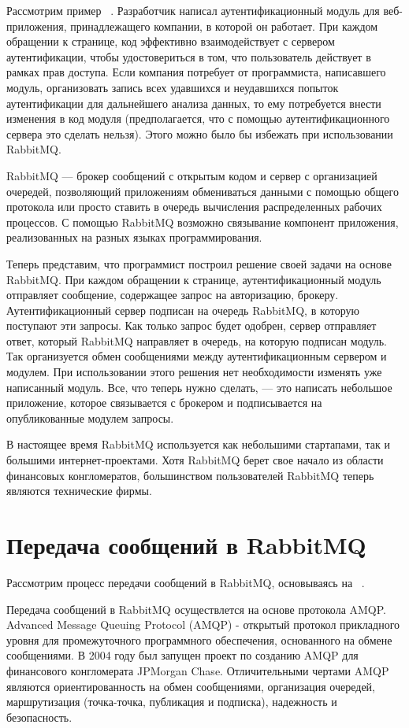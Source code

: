 Рассмотрим пример ~\cite{rabbitmq_in_action}. Разработчик написал аутентификационный модуль для веб-приложения, принадлежащего компании, в которой он работает. При каждом обращении к странице, код эффективно взаимодействует с сервером аутентификации, чтобы удостовериться в том, что пользователь действует в рамках прав доступа. Если компания потребует от программиста, написавшего модуль, организовать запись всех удавшихся и неудавшихся попыток аутентификации для дальнейшего анализа данных, то ему потребуется внести изменения в код модуля (предполагается, что с помощью аутентификационного сервера это сделать нельзя). Этого можно было бы избежать при использовании RabbitMQ.

RabbitMQ --- брокер сообщений с открытым кодом и сервер с организацией очередей, позволяющий приложениям обмениваться данными с помощью общего протокола или просто ставить в очередь вычисления распределенных рабочих процессов. С помощью RabbitMQ возможно связывание компонент приложения, реализованных на разных языках программирования.

Теперь представим, что программист построил решение своей задачи на основе RabbitMQ. При каждом обращении к странице, аутентификационный модуль отправляет сообщение, содержащее запрос на авторизацию, брокеру. Аутентификационный сервер подписан на очередь RabbitMQ, в которую поступают эти запросы. Как только запрос будет одобрен, сервер отправляет ответ, который RabbitMQ направляет в очередь, на которую подписан модуль. Так организуется обмен сообщениями между аутентификационным сервером и модулем. При использовании этого решения нет необходимости изменять уже написанный модуль.  Все, что теперь нужно сделать, --- это написать небольшое приложение, которое связывается с брокером и подписывается на опубликованные модулем запросы.

В настоящее время RabbitMQ используется как небольшими стартапами, так и большими интернет-проектами. Хотя RabbitMQ берет свое начало из области финансовых конгломератов, большинством пользователей RabbitMQ теперь являются технические фирмы.

\section{Передача сообщений в RabbitMQ} 
Рассмотрим процесс передачи сообщений в RabbitMQ, основываясь на ~\cite{rabbitmq_in_action}.

Передача сообщений в RabbitMQ осуществлется на основе протокола AMQP. Advanced Message Queuing Protocol (AMQP) - открытый протокол прикладного уровня для промежуточного программного обеспечения, основанного на обмене сообщениями. В 2004 году был запущен проект по созданию AMQP для финансового конгломерата JPMorgan Chase. Отличительными чертами AMQP являются ориентированность на обмен сообщениями, организация очередей, маршрутизация (точка-точка, публикация и подписка), надежность и безопасность.

